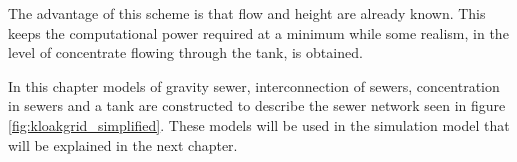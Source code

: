 The advantage of this scheme is that flow and height are already known. This keeps the computational power required at a minimum while some realism, in the level of concentrate flowing through the tank, is obtained.


In this chapter models of gravity sewer, interconnection of sewers, concentration in sewers and a tank are constructed to describe the sewer network seen in figure \ref{fig:kloakgrid_simplified}. These models will be used in the simulation model that will be explained in the next chapter.  






